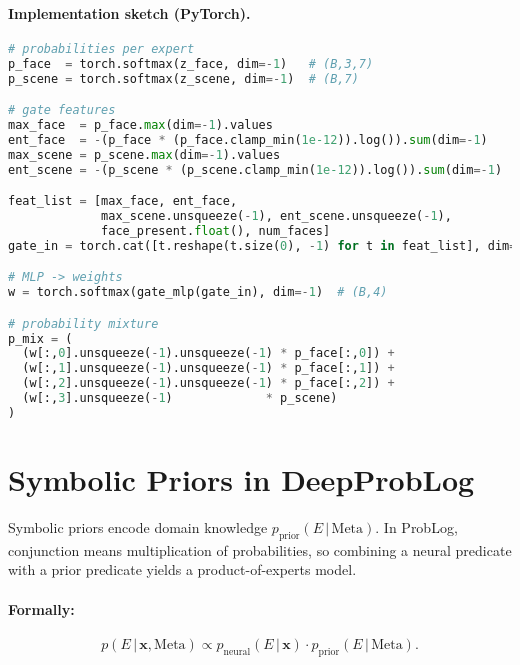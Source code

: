 \documentclass[12pt]{article}
\begin{document}
\paragraph{Implementation sketch (PyTorch).}
\begin{lstlisting}[language=Python]
# probabilities per expert
p_face  = torch.softmax(z_face, dim=-1)   # (B,3,7)
p_scene = torch.softmax(z_scene, dim=-1)  # (B,7)

# gate features
max_face  = p_face.max(dim=-1).values
ent_face  = -(p_face * (p_face.clamp_min(1e-12)).log()).sum(dim=-1)
max_scene = p_scene.max(dim=-1).values
ent_scene = -(p_scene * (p_scene.clamp_min(1e-12)).log()).sum(dim=-1)

feat_list = [max_face, ent_face,
             max_scene.unsqueeze(-1), ent_scene.unsqueeze(-1),
             face_present.float(), num_faces]
gate_in = torch.cat([t.reshape(t.size(0), -1) for t in feat_list], dim=1)  # (B,D)

# MLP -> weights
w = torch.softmax(gate_mlp(gate_in), dim=-1)  # (B,4)

# probability mixture
p_mix = (
  (w[:,0].unsqueeze(-1).unsqueeze(-1) * p_face[:,0]) +
  (w[:,1].unsqueeze(-1).unsqueeze(-1) * p_face[:,1]) +
  (w[:,2].unsqueeze(-1).unsqueeze(-1) * p_face[:,2]) +
  (w[:,3].unsqueeze(-1)             * p_scene)
)
\end{lstlisting}

\section{Symbolic Priors in DeepProbLog}
Symbolic priors encode domain knowledge $p_{\text{prior}}(E\,|\,\text{Meta})$.  
In ProbLog, conjunction means multiplication of probabilities, so combining a neural predicate with a prior predicate yields a product-of-experts model.

\paragraph{Formally:}
\[
p(E\,|\,\bm{x},\text{Meta}) \propto p_{\text{neural}}(E\,|\,\bm{x})\cdot p_{\text{prior}}(E\,|\,\text{Meta}).
\]
\end{document}
